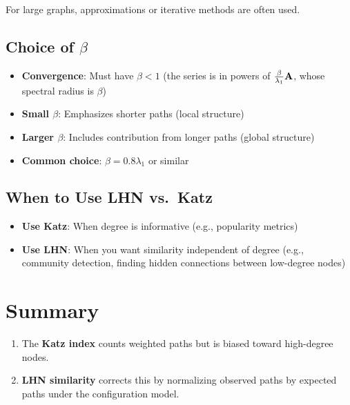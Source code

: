 \begin{notechapter}
For large graphs, approximations or iterative methods are often used.

\subsection{Choice of $\beta$}

\begin{itemize}
    \item \textbf{Convergence}: Must have $\beta < 1$ (the series is in powers of $\frac{\beta}{\lambda_1}\mathbf{A}$, whose spectral radius is $\beta$)
    \item \textbf{Small $\beta$}: Emphasizes shorter paths (local structure)
    \item \textbf{Larger $\beta$}: Includes contribution from longer paths (global structure)
    \item \textbf{Common choice}: $\beta = 0.8\lambda_1$ or similar
\end{itemize}

\subsection{When to Use LHN vs.\ Katz}

\begin{itemize}
    \item \textbf{Use Katz}: When degree is informative (e.g., popularity metrics)
    \item \textbf{Use LHN}: When you want similarity independent of degree (e.g., community detection, finding hidden connections between low-degree nodes)
\end{itemize}

\section{Summary}

\begin{tcolorbox}[colback=gray!10, colframe=gray!50!black, title=\textbf{Key Takeaways}]
\begin{enumerate}
    \item The \textbf{Katz index} counts weighted paths but is biased toward high-degree nodes.
    
    \item \textbf{LHN similarity} corrects this by normalizing observed paths by expected paths under the configuration model.
    

\end{enumerate}
\end{tcolorbox}
\end{notechapter}
